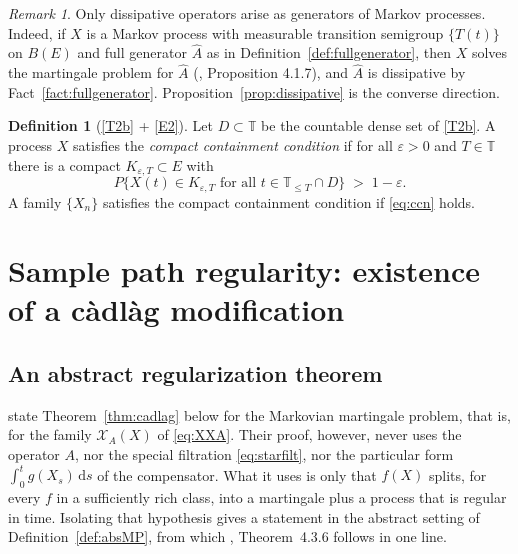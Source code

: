 \documentclass[11pt,a4paper]{article}
\theoremstyle{plain}
\theoremstyle{definition}
\newtheorem{definition}[theorem]{Definition}
\theoremstyle{remark}
\newtheorem{remark}[theorem]{Remark}
\newcommand{\T}{\mathbb{T}}                     %
\newcommand{\Bdd}{B}                           %
\newcommand{\XX}{\mathcal{X}}                  %
\newcommand{\dif}{\,\mathrm{d}}
\newcommand{\EK}{\cite{EK86}}
\begin{document}
\begin{remark}
  \label{rem:fullgenerator}
  Only dissipative operators arise as generators of Markov processes.  Indeed, if
  $X$ is a Markov process with measurable transition semigroup $\{T(t)\}$ on
  $\Bdd(E)$ and full generator $\hat{A}$ as in
  Definition~\ref{def:fullgenerator}, then $X$ solves the martingale problem for
  $\hat{A}$ (\EK, Proposition 4.1.7), and $\hat{A}$ is dissipative by
  Fact~\ref{fact:fullgenerator}.  Proposition~\ref{prop:dissipative} is the
  converse direction.
\end{remark}

\begin{definition}[\eqref{T2b} + \eqref{E2}]
  \label{def:cc}
  Let $D \subset \T$ be the countable dense set of \eqref{T2b}.  A process $X$
  satisfies the \emph{compact containment condition} if for all
  $\varepsilon > 0$ and $T \in \T$ there is a compact
  $K_{\varepsilon,T} \subset E$ with
  \begin{equation}
    \label{eq:cc}
    P\bigl\{ X(t) \in K_{\varepsilon,T} \text{ for all } t \in \T_{\leq T} \cap D \bigr\}
      \;>\; 1 - \varepsilon .
  \end{equation}
  A family $\{X_n\}$ satisfies the compact containment condition if
  \eqref{eq:ccn} holds.
\end{definition}

\section{Sample path regularity: existence of a c\`adl\`ag modification}
\label{sec:cadlag}

\subsection{An abstract regularization theorem}
\label{ssec:absreg}

\EK{} state Theorem~\ref{thm:cadlag} below for the Markovian martingale problem,
that is, for the family $\XX_A(X)$ of \eqref{eq:XXA}.  Their proof, however, never
uses the operator $A$, nor the special filtration \eqref{eq:starfilt}, nor the
particular form $\int_0^t g(X_s)\dif s$ of the compensator.  What it uses is only
that $f(X)$ splits, for every $f$ in a sufficiently rich class, into a martingale
plus a process that is regular in time.  Isolating that hypothesis gives a
statement in the abstract setting of Definition~\ref{def:absMP}, from which
\EK, Theorem~4.3.6 follows in one line.
\end{document}
